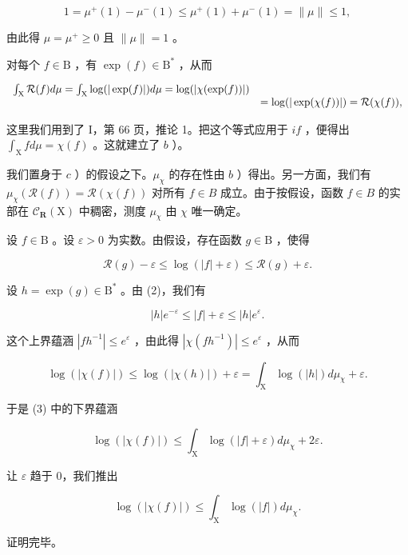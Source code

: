 \[
1 = \mu^ {+} (1) - \mu^ {-} (1) \leqslant \mu^ {+} (1) + \mu^ {-} (1) = \| \mu \| \leqslant 1,
\]

由此得 \(\mu = \mu^{+} \geqslant 0\) 且 \(\|\mu\| = 1\) 。

对每个 \(f \in \mathrm{B}\) ，有 \(\exp(f) \in \mathrm{B}^*\) ，从而

\[
\begin{array}{r l} \int_ {\mathrm{X}} \mathcal {R} (f) d \mu = \int_ {\mathrm{X}} \log (| \exp (f) |) d \mu = \log (| \chi (\exp (f)) |) \\ & = \log (| \exp (\chi (f)) |) = \mathcal {R} (\chi (f)), \end{array}
\]

这里我们用到了 I，第 66 页，推论 1。把这个等式应用于 \(if\) ，便得出 \(\int_{\mathrm{X}} f d\mu = \chi(f)\) 。这就建立了 \(b\) ）。

我们置身于 \(c\) ）的假设之下。\(\mu_{\chi}\) 的存在性由 \(b\) ）得出。另一方面，我们有 \(\mu_{\chi}(\mathcal{R}(f)) = \mathcal{R}(\chi(f))\) 对所有 \(f \in B\) 成立。由于按假设，函数 \(f \in B\) 的实部在 \(\mathcal{C}_{\mathbf{R}}(\mathrm{X})\) 中稠密，测度 \(\mu_{\chi}\) 由 \(\chi\) 唯一确定。

设 \(f \in \mathrm{B}\) 。设 \(\varepsilon > 0\) 为实数。由假设，存在函数 \(g \in \mathrm{B}\) ，使得

\[
\mathcal {R} (g) - \varepsilon \leqslant \log (| f | + \varepsilon) \leqslant \mathcal {R} (g) + \varepsilon .\tag{2}
\]

设 \(h = \exp(g) \in \mathrm{B}^*\) 。由 (2)，我们有

\[
| h | e ^ {- \varepsilon} \leqslant | f | + \varepsilon \leqslant | h | e ^ {\varepsilon}.\tag{3}
\]

这个上界蕴涵 \(|fh^{-1}| \leqslant e^{\varepsilon}\) ，由此得 \(|\chi (fh^{-1})| \leqslant e^{\varepsilon}\) ，从而

\[
\log (| \chi (f) |) \leqslant \log (| \chi (h) |) + \varepsilon = \int_ {\mathrm{X}} \log (| h |) d \mu_ {\chi} + \varepsilon .\tag{4}
\]

于是 (3) 中的下界蕴涵

\[
\log (| \chi (f) |) \leqslant \int_ {\mathrm{X}} \log (| f | + \varepsilon) d \mu_ {\chi} + 2 \varepsilon .
\]

让 \(\varepsilon\) 趋于 0，我们推出

\[
\log (| \chi (f) |) \leqslant \int_ {\mathrm{X}} \log (| f |) d \mu_ {\chi}.
\]

证明完毕。

